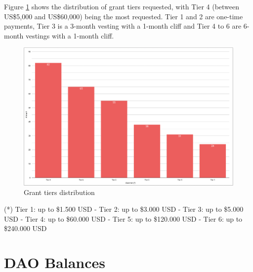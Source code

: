 \documentclass[MSE,Master,english]{twbook}%
\begin{document}
Figure \ref{fig:tier_distribution} shows the distribution of grant tiers requested, with Tier 4 (between US\$5,000 and US\$60,000) being the most requested. Tier 1 and 2 are one-time payments, Tier 3 is a 3-month vesting with a 1-month cliff and Tier 4 to 6 are 6-month vestings with a 1-month cliff.
\begin{figure}[H]
  \centering
  \includegraphics[width=\textwidth]{metrics/tier_distribution.png}
  \caption{Grant tiers distribution}
  \label{fig:tier_distribution}
\end{figure}
(*) Tier 1: up to \$1.500 USD - Tier 2: up to \$3.000 USD - Tier 3: up to \$5.000 USD - Tier 4: up to \$60.000 USD - Tier 5: up to \$120.000 USD - Tier 6: up to \$240.000 USD

\section{DAO Balances}
\end{document}
